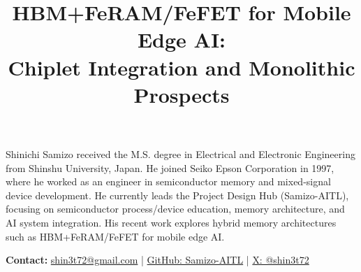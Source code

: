 \documentclass[10pt,conference]{IEEEtran}
\title{HBM+FeRAM/FeFET for Mobile Edge AI:\\
Chiplet Integration and Monolithic Prospects}
\author{%
  \IEEEauthorblockN{Shinichi Samizo}%
  \IEEEauthorblockA{Project Design Hub (Samizo-AITL), Japan\\
  Email: \href{mailto:shin3t72@gmail.com}{shin3t72@gmail.com}}%
}
\begin{document}
\maketitle










\begin{IEEEbiographynophoto}{Shinichi Samizo}
received the M.S. degree in Electrical and Electronic Engineering from Shinshu University, Japan.
He joined Seiko Epson Corporation in 1997, where he worked as an engineer in semiconductor memory and mixed-signal device development.
He currently leads the Project Design Hub (Samizo-AITL), focusing on semiconductor process/device education, memory architecture, and AI system integration.
His recent work explores hybrid memory architectures such as HBM+FeRAM/FeFET for mobile edge AI.

\textbf{Contact:}
\href{mailto:shin3t72@gmail.com}{shin3t72@gmail.com} \;|\;
\href{https://github.com/Samizo-AITL}{GitHub: Samizo-AITL} \;|\;
\href{https://x.com/shin3t72}{X: @shin3t72}
\end{IEEEbiographynophoto}
\end{document}
